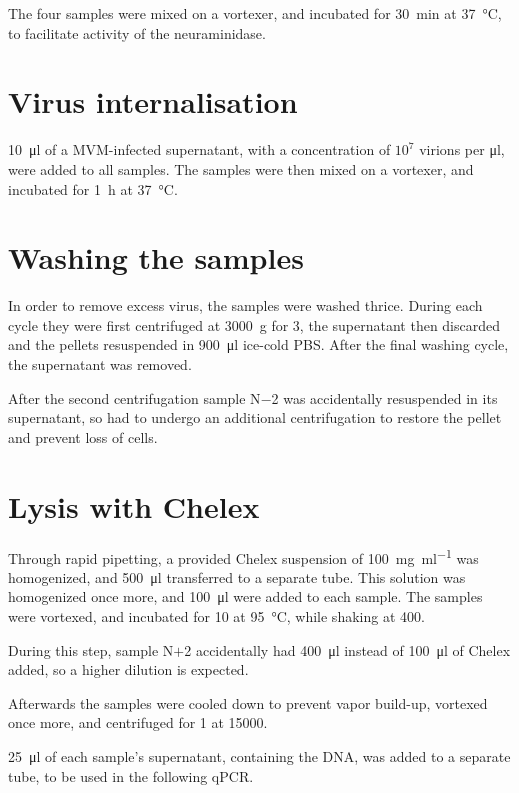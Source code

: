 \documentclass[a4paper,english]{scrreprt}
\begin{document}
The four samples were mixed on a vortexer, and incubated for \SI{30}{\minute}
at \SI{37}{\celsius}, to facilitate activity of the neuraminidase.

\section{Virus internalisation}

\SI{10}{\ul} of a MVM-infected supernatant, with a concentration of $10^7$
virions per \si{\ul}, were added to all samples. The samples were then mixed on
a vortexer, and incubated for \SI{1}{\hour} at \SI{37}{\celsius}.

\section{Washing the samples}

In order to remove excess virus, the samples were washed thrice. During each
cycle they were first centrifuged at \SI{3000}{g} for \SI{3}{\min}, the
supernatant then discarded and the pellets resuspended in \SI{900}{\ul} ice-cold
PBS. After the final washing cycle, the supernatant was removed.

After the second centrifugation sample N$-$2 was accidentally resuspended in
its supernatant, so had to undergo an additional centrifugation to restore the
pellet and prevent loss of cells.

\section{Lysis with Chelex}

Through rapid pipetting, a provided Chelex suspension of \SI{100}{\mg \per \ml}
was homogenized, and \SI{500}{\ul} transferred to a separate tube. This
solution was homogenized once more, and \SI{100}{\ul} were added to each
sample. The samples were vortexed, and incubated for \SI{10}{\min} at
\SI{95}{\celsius}, while shaking at \SI{400}{\rpm}.

During this step, sample N$+$2 accidentally had \SI{400}{\ul} instead of
\SI{100}{\ul} of Chelex added, so a higher dilution is expected.

Afterwards the samples were cooled down to prevent vapor build-up, vortexed
once more, and centrifuged for \SI{1}{\min} at \SI{15000}{\rpm}.

\SI{25}{\ul} of each sample's supernatant, containing the DNA, was added to a
separate tube, to be used in the following qPCR.
\end{document}
